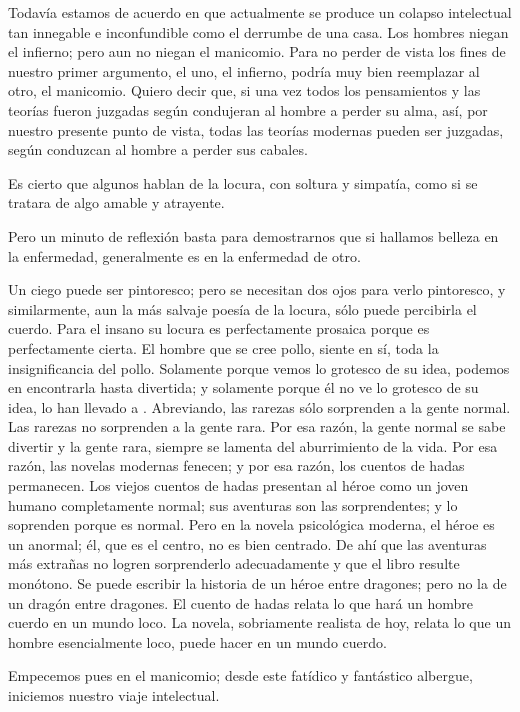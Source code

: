 Todavía estamos de acuerdo en que actualmente se produce un colapso intelectual tan innegable e
inconfundible como el derrumbe de una casa. Los hombres niegan el infierno; pero aun no niegan el
manicomio. Para no perder de vista los fines de nuestro primer argumento, el uno, el infierno, podría muy
bien reemplazar al otro, el manicomio. Quiero decir que, si una vez todos los pensamientos y las teorías
fueron juzgadas según condujeran al hombre a perder su alma, así, por nuestro presente punto de vista,
todas las teorías modernas pueden ser juzgadas, según conduzcan al hombre a perder sus cabales.

Es cierto que algunos hablan de la locura, con soltura y simpatía, como si se tratara de algo amable
y atrayente.

Pero un minuto de reflexión basta para demostrarnos que si hallamos belleza en la enfermedad,
generalmente es en la enfermedad de otro.

Un ciego puede ser pintoresco; pero se necesitan dos ojos para verlo pintoresco, y similarmente,
aun la más salvaje poesía de la locura, sólo puede percibirla el cuerdo. Para el insano su locura es
perfectamente prosaica porque es perfectamente cierta. El hombre que se cree pollo, siente en sí, toda la
insignificancia del pollo. Solamente porque vemos lo grotesco de su idea, podemos en encontrarla hasta
divertida; y solamente porque él no ve lo grotesco de su idea, lo han llevado a . Abreviando, las
rarezas sólo sorprenden a la gente normal. Las rarezas no sorprenden a la gente rara. Por esa razón, la
gente normal se sabe divertir y la gente rara, siempre se lamenta del aburrimiento de la vida. Por esa
razón, las novelas modernas fenecen; y por esa razón, los cuentos de hadas permanecen. Los viejos
cuentos de hadas presentan al héroe como un joven humano completamente normal; sus aventuras son las
sorprendentes; y lo soprenden porque es normal. Pero en la novela psicológica moderna, el héroe es un
anormal; él, que es el centro, no es bien centrado. De ahí que las aventuras más extrañas no logren
sorprenderlo adecuadamente y que el libro resulte monótono. Se puede escribir la historia de un héroe
entre dragones; pero no la de un dragón entre dragones. El cuento de hadas relata lo que hará un hombre
cuerdo en un mundo loco. La novela, sobriamente realista de hoy, relata lo que un hombre esencialmente
loco, puede hacer en un mundo cuerdo.

Empecemos pues en el manicomio; desde este fatídico y fantástico albergue, iniciemos nuestro viaje
intelectual.

